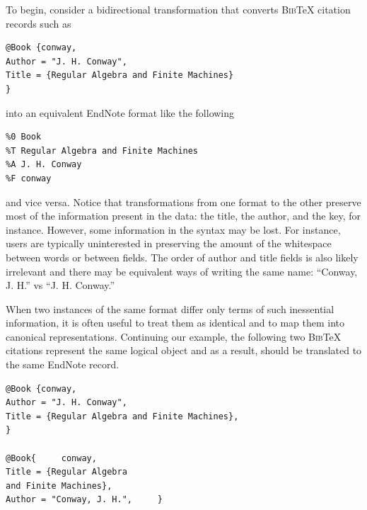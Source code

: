\documentclass[acmsmall,review,anonymous]{acmart}\settopmatter{printfolios=true,printccs=false,printacmref=false}
\newcommand{\bibtex}{\textsc{Bib}\TeX{}}
\begin{document}
To begin, consider a bidirectional transformation that converts
\bibtex{} citation records such as
\begin{verbatim}
@Book {conway,
Author = "J. H. Conway",
Title = {Regular Algebra and Finite Machines}
}
\end{verbatim}
\noindent
into an equivalent EndNote format like the following
\begin{verbatim}
%0 Book
%T Regular Algebra and Finite Machines
%A J. H. Conway
%F conway
\end{verbatim}
\noindent
and vice versa.
%
Notice that transformations from one format to the other preserve
most of the information present in the data:  the title, the author,
and the key, for instance.  However, some information in the syntax
may be lost.  For instance, users are typically uninterested in preserving
the amount of the whitespace between words or
between fields.  The order of author and title fields is also likely
irrelevant and there may be equivalent ways of writing the same
name:  ``Conway, J. H.'' vs ``J. H. Conway.''


When two instances of the same format differ only terms of such inessential
information, it is often useful to treat them as identical and to map them
into canonical representations.
Continuing our example, the following two
\bibtex{} citations represent the same logical object and as a result, should
be translated to the same EndNote record.
\begin{verbatim}
@Book {conway,
Author = "J. H. Conway",
Title = {Regular Algebra and Finite Machines},
}

@Book{     conway,
Title = {Regular Algebra
and Finite Machines},
Author = "Conway, J. H.",     }
\end{verbatim}
\end{document}
